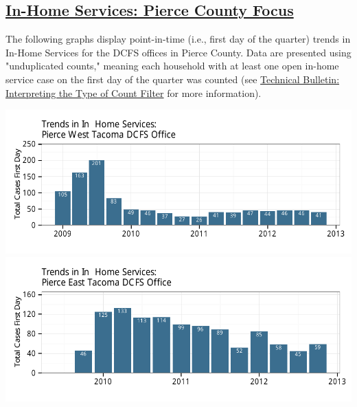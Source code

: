 \documentclass{article}\usepackage{graphicx, color}
\makeatletter
\def\maxwidth{ %
  \ifdim\Gin@nat@width>\linewidth
    \linewidth
  \else
    \Gin@nat@width
  \fi
}
\newenvironment{knitrout}{}{} %
\makeatother
\begin{document}
\subsection{\href{http://www.partnersforourchildren.org/child-well-being/visualizations/home-services/trends}
    {In-Home Services: Pierce County Focus}
}
The following graphs display point-in-time (i.e., first day of the quarter) trends in In-Home Services for the DCFS offices in
Pierce County. Data are presented using "unduplicated counts," meaning each household with at least one open in-home service case on the first day of the quarter was counted (see \href{http://http://www.partnersforourchildren.org/publications/using-different-count-types-data-portal}{Technical Bulletin: Interpreting the Type of Count Filter} for more information). 
\nopagebreak[3]
\begin{knitrout}
\color{fgcolor}

{\centering \includegraphics[width=\maxwidth]{figure/ihs_focus1} 
\includegraphics[width=\maxwidth]{figure/ihs_focus2} 

}



\end{knitrout}
\end{document}
